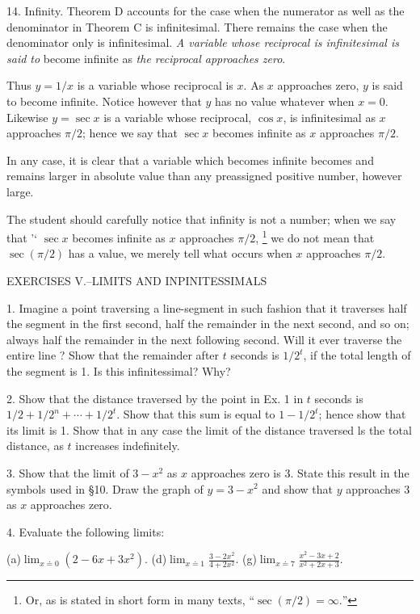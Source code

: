 \documentclass[12pt]{article}
\begin{document}
14. Infinity.
Theorem D accounts for the case when the
numerator as well as the denominator in Theorem C is 
infinitesimal. There remains the case when the denominator only
is infinitesimal. {\it A variable whose reciprocal is infinitesimal is
said to} become infinite as {\it the reciprocal approaches zero}.

Thus $y=1/x$ is a variable whose reciprocal is $x$. As $x$ 
approaches zero, $y$ is said to become infinite. Notice however
that $y$ has no value whatever when $x=0$.
Likewise $y=\sec x$ is a variable whose reciprocal, $\cos x$, is
infinitesimal as $x$ approaches $\pi/2$; hence we say that $\sec x$ 
becomes infinite as $x$ approaches $\pi/2$.

In any case, it is clear that a variable which becomes infinite
becomes and remains larger in absolute value than any 
preassigned positive number, however large.

The student should carefully notice that infinity is not a
number; when we say that '` $\sec x$ becomes infinite as $x$ 
approaches $\pi/2$,
\footnote{Or, as is stated in short form in many texts, ``$\sec(\pi/2)=\infty.$''}
we do not mean that $\sec(\pi/2)$ has a value, we
merely tell what occurs when $x$ approaches $\pi/2$.

\begin{center}
EXERCISES V.--LIMITS AND INPINITESSIMALS
\end{center}

1. Imagine a point traversing a line-segment in such fashion that it
traverses half the segment in the first second, half the remainder in the
next second, and so on; always half the remainder in the next following
second. Will it ever traverse the entire line ? Show that the remainder
after $t$ seconds is $1/2^{t}$, if the total length of the segment is 1. 
Is this infinitessimal? Why?

2. Show that the distance traversed by the point in Ex. 1 in $t$ seconds
is $1/2+1/2^{n}+\cdots+1/2^{t}$. Show that this sum is equal to $1-1/2^{t}$; hence show that its limit is 1. Show that in any case the limit of the distance
traversed ls the total distance, as $t$ increases indefinitely.

3. Show that the limit of $3-x^{2}$ as $x$ approaches zero is 3. State this
result in the symbols used in \S 10. Draw the graph of $y=3-x^{2}$ and
show that $y$ approaches 3 as $x$ approaches zero.

4. Evaluate the following limits:

(a)$\displaystyle \lim_{x \doteq 0}(2-6x+3x^{2})$.
(d)$\displaystyle \lim_{x \doteq 1}\frac{3-2x^{2}}{4+2x^{2}}$. 
(g)$\displaystyle \lim_{x \doteq 7}\frac{x^{2}-3x+2}{x^{2}+2x+3}$.
\end{document}
